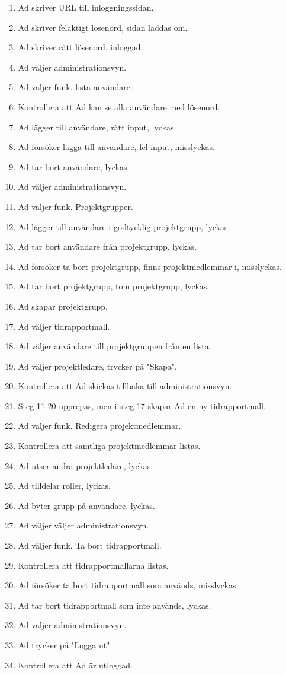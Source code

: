 \documentclass[a4paper]{article}
\begin{document}
\begin{ST}
\begin{enumerate}
\item Ad skriver URL till inloggningssidan.
\item Ad skriver felaktigt lösenord, sidan laddas om.
\item Ad skriver rätt lösenord, inloggad.
\item Ad väljer administrationsvyn.
\item Ad väljer funk. lista användare.
\item Kontrollera att Ad kan se alla användare med lösenord.
\item Ad lägger till användare, rätt input, lyckas.
\item Ad försöker lägga till användare, fel input, misslyckas.
\item Ad tar bort användare, lyckas.
\item Ad väljer administrationsvyn.
\item Ad väljer funk. Projektgrupper.
\item Ad lägger till användare i godtycklig projektgrupp, lyckas.
\item Ad tar bort användare från projektgrupp, lyckas.
\item Ad försöker ta bort projektgrupp, finns projektmedlemmar i, misslyckas.
\item Ad tar bort projektgrupp, tom projektgrupp, lyckas.
\item Ad skapar projektgrupp.
\item Ad väljer tidrapportmall.
\item Ad väljer användare till projektgruppen från en lista.
\item Ad väljer projektledare, trycker på "Skapa".
\item Kontrollera att Ad skickas tillbaka till administrationsvyn.
\item Steg 11-20 upprepas, men i steg 17 skapar Ad en ny tidrapportmall.
\item Ad väljer funk. Redigera projektmedlemmar.
\item Kontrollera att samtliga projektmedlemmar listas.
\item Ad utser andra projektledare, lyckas.
\item Ad tilldelar roller, lyckas.
\item Ad byter grupp på användare, lyckas.
\item Ad väljer väljer administrationsvyn.
\item Ad väljer funk. Ta bort tidrapportmall.
\item Kontrollera att tidrapportmallarna listas.
\item Ad försöker ta bort tidrapportmall som används, misslyckas.
\item Ad tar bort tidrapportmall som inte används, lyckas.
\item Ad väljer administrationsvyn.
\item Ad trycker på "Logga ut".
\item Kontrollera att Ad är utloggad.
\end{enumerate}

\end{ST}
\end{document}
